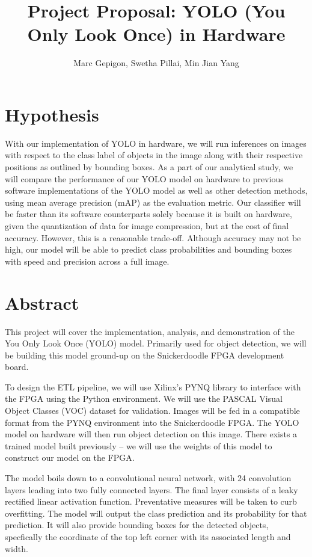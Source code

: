 \documentclass[10pt, twocolumn, letterpaper]{article}
\begin{document}
\title{\Large \bf Project Proposal: YOLO (You Only Look Once) in Hardware}
\author{Marc Gepigon, Swetha Pillai, Min Jian Yang}
\date{}
\maketitle

\section{Hypothesis}
With our implementation of YOLO in hardware, we will run inferences on images with respect to the class label of objects in the image along with their respective positions as outlined by bounding boxes. As a part of our analytical study, we will compare the performance of our YOLO model on hardware to previous software implementations of the YOLO model as well as other detection methods, using mean average precision (mAP) as the evaluation metric. Our classifier will be faster than its software counterparts solely because it is built on hardware, given the quantization of data for image compression, but at the cost of final accuracy. However, this is a reasonable trade-off. Although accuracy may not be high, our model will be able to predict class probabilities and bounding boxes with speed and precision across a full image.
 

\section{Abstract}
This project will cover the implementation, analysis, and demonstration of the You Only Look Once (YOLO) model. Primarily used for object detection, we will be building this model ground-up on the Snickerdoodle FPGA development board. 

\vspace{\baselineskip}
\noindent
To design the ETL pipeline, we will use Xilinx's PYNQ library to interface with the FPGA using the Python environment. We will use the PASCAL Visual Object Classes (VOC) dataset for validation. Images will be fed in a compatible format from the PYNQ environment into the Snickerdoodle FPGA. The YOLO model on hardware will then run object detection on this image. There exists a trained model built previously -- we will use the weights of this model to construct our model on the FPGA. 

\vspace{\baselineskip}
\noindent
The model boils down to a convolutional neural network, with 24 convolution layers leading into two fully connected layers. The final layer consists of a leaky rectified linear activation function. Preventative measures will be taken to curb overfitting. The model will output the class prediction and its probability for that prediction. It will also provide bounding boxes for the detected objects, specfically the coordinate of the top left corner with its associated length and width. 
\end{document}
